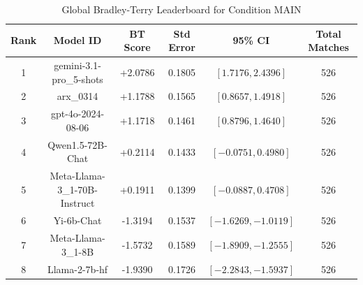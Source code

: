 \begin{table}[ht]
\centering
\caption{Global Bradley-Terry Leaderboard for Condition \textsc{MAIN}}
\label{tab:leaderboard_main}
\begin{tabular}{cccccc}
\hline
\textbf{Rank} & \textbf{Model ID} & \textbf{BT Score} & \textbf{Std Error} & \textbf{95\% CI} & \textbf{Total Matches} \\
\hline
1 & gemini-3.1-pro\_5-shots & +2.0786 & 0.1805 & $[1.7176, 2.4396]$ & 526 \\
2 & arx\_0314 & +1.1788 & 0.1565 & $[0.8657, 1.4918]$ & 526 \\
3 & gpt-4o-2024-08-06 & +1.1718 & 0.1461 & $[0.8796, 1.4640]$ & 526 \\
4 & Qwen1.5-72B-Chat & +0.2114 & 0.1433 & $[-0.0751, 0.4980]$ & 526 \\
5 & Meta-Llama-3\_1-70B-Instruct & +0.1911 & 0.1399 & $[-0.0887, 0.4708]$ & 526 \\
6 & Yi-6b-Chat & -1.3194 & 0.1537 & $[-1.6269, -1.0119]$ & 526 \\
7 & Meta-Llama-3\_1-8B & -1.5732 & 0.1589 & $[-1.8909, -1.2555]$ & 526 \\
8 & Llama-2-7b-hf & -1.9390 & 0.1726 & $[-2.2843, -1.5937]$ & 526 \\
\hline
\end{tabular}
\end{table}
